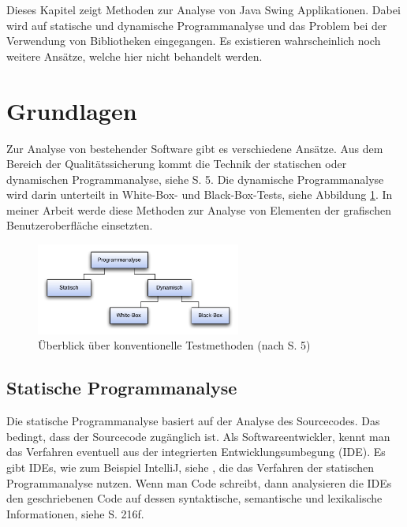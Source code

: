   Dieses Kapitel zeigt Methoden zur Analyse von Java Swing Applikationen.
  Dabei wird auf statische und dynamische Programmanalyse und das Problem bei
  der Verwendung von Bibliotheken eingegangen. Es existieren wahrscheinlich
  noch weitere Ansätze, welche hier nicht behandelt werden.
  
  \section{Grundlagen}
  
  Zur Analyse von bestehender Software gibt es verschiedene Ansätze. Aus dem
  Bereich der Qualitätssicherung kommt die Technik der statischen oder
  dynamischen Programmanalyse, siehe \cite{SoftwareanalyseBegriffeUndTechniken}
  S. 5. Die dynamische Programmanalyse wird darin unterteilt in White-Box-
  und Black-Box-Tests, siehe Abbildung \ref{img:programmanalyse}. In meiner
  Arbeit werde diese Methoden zur Analyse von Elementen der grafischen
  Benutzeroberfläche einsetzten.
  
  \begin{figure}[ht]
    \begin{center}
      \includegraphics[width=0.6\textwidth]{./image/programmanalyse.pdf}
      \caption{Überblick über konventionelle Testmethoden (nach
      \cite{SoftwareanalyseBegriffeUndTechniken} S. 5)}
      \label{img:programmanalyse}
    \end{center}
  \end{figure}
  
  \subsection{Statische Programmanalyse}

  Die statische Programmanalyse basiert auf der Analyse des Sourcecodes. Das
  bedingt, dass der Sourcecode zugänglich ist. Als Softwareentwickler, kennt
  man das Verfahren eventuell aus der integrierten Entwicklungsumbegung
  (\acs{IDE}). Es gibt \acp{IDE}, wie zum Beispiel IntelliJ, siehe
  \cite{StaticCodeAnalysisIntelliJ}, die das Verfahren der statischen
  Programmanalyse nutzen. Wenn man Code schreibt, dann analysieren die
  \acp{IDE} den geschriebenen Code auf dessen syntaktische, semantische und
  lexikalische Informationen, siehe
  \cite{SoftwareQualitaetsmanagementInDerPraxis} S. 216f.
  
